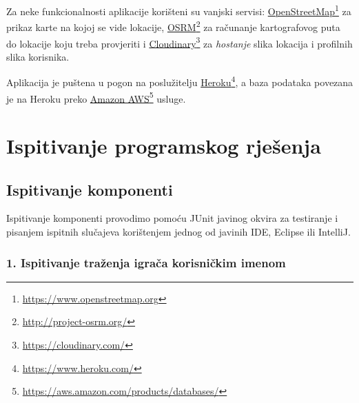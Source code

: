 			{Za neke funkcionalnosti aplikacije korišteni su vanjski servisi: \underline{OpenStreetMap}\footnote{\url{https://www.openstreetmap.org}} za prikaz karte na kojoj se vide lokacije, \underline{OSRM}\footnote{\url{http://project-osrm.org/}}
			za računanje kartografovog puta do lokacije koju treba provjeriti i \underline{Cloudinary}\footnote{\url{https://cloudinary.com/}} za \textit{hostanje} slika lokacija i profilnih slika korisnika.}
			
			{Aplikacija je puštena u pogon na poslužitelju \underline{Heroku}\footnote{\url{https://www.heroku.com/}}, a baza podataka povezana je na Heroku preko \underline{Amazon AWS}\footnote{\url{https://aws.amazon.com/products/databases/}} usluge.}
			\eject 
		
	
		\section{Ispitivanje programskog rješenja}
			
%			
	
			
			\subsection{Ispitivanje komponenti}

			{Ispitivanje komponenti provodimo pomoću JUnit javinog okvira za testiranje i pisanjem ispitnih slučajeva korištenjem jednog od javinih IDE, Eclipse ili IntelliJ.}
			
				\subsubsection {1. Ispitivanje traženja igrača korisničkim imenom}
				
